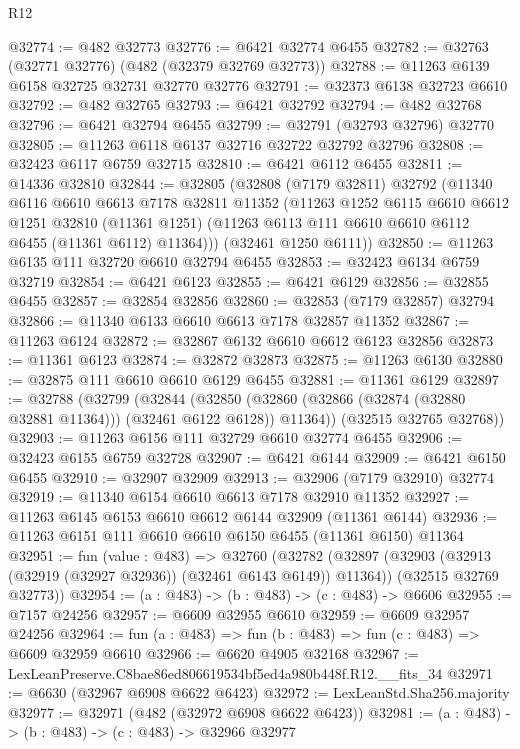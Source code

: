 \begin{lexlean}{R12}
\begin{coremodule}
@32774 := @482 @32773
@32776 := @6421 @32774 @6455
@32782 := @32763 (@32771 @32776) (@482 (@32379 @32769 @32773))
@32788 := @11263 @6139 @6158 @32725 @32731 @32770 @32776
@32791 := @32373 @6138 @32723 @6610
@32792 := @482 @32765
@32793 := @6421 @32792
@32794 := @482 @32768
@32796 := @6421 @32794 @6455
@32799 := @32791 (@32793 @32796) @32770
@32805 := @11263 @6118 @6137 @32716 @32722 @32792 @32796
@32808 := @32423 @6117 @6759 @32715
@32810 := @6421 @6112 @6455
@32811 := @14336 @32810
@32844 := @32805
    (@32808
      (@7179 @32811)
      @32792
      (@11340
        @6116
        @6610
        @6613
        @7178
        @32811
        @11352
        (@11263
          @1252
          @6115
          @6610
          @6612
          @1251
          @32810
          (@11361 @1251)
          (@11263 @6113 @111 @6610 @6610 @6112 @6455 (@11361 @6112) @11364)))
      (@32461 @1250 @6111))
@32850 := @11263 @6135 @111 @32720 @6610 @32794 @6455
@32853 := @32423 @6134 @6759 @32719
@32854 := @6421 @6123
@32855 := @6421 @6129
@32856 := @32855 @6455
@32857 := @32854 @32856
@32860 := @32853 (@7179 @32857) @32794
@32866 := @11340 @6133 @6610 @6613 @7178 @32857 @11352
@32867 := @11263 @6124
@32872 := @32867 @6132 @6610 @6612 @6123 @32856
@32873 := @11361 @6123
@32874 := @32872 @32873
@32875 := @11263 @6130
@32880 := @32875 @111 @6610 @6610 @6129 @6455
@32881 := @11361 @6129
@32897 := @32788
    (@32799
      (@32844
        (@32850 (@32860 (@32866 (@32874 (@32880 @32881 @11364))) (@32461 @6122 @6128)) @11364))
      (@32515 @32765 @32768))
@32903 := @11263 @6156 @111 @32729 @6610 @32774 @6455
@32906 := @32423 @6155 @6759 @32728
@32907 := @6421 @6144
@32909 := @6421 @6150 @6455
@32910 := @32907 @32909
@32913 := @32906 (@7179 @32910) @32774
@32919 := @11340 @6154 @6610 @6613 @7178 @32910 @11352
@32927 := @11263 @6145 @6153 @6610 @6612 @6144 @32909 (@11361 @6144)
@32936 := @11263 @6151 @111 @6610 @6610 @6150 @6455 (@11361 @6150) @11364
@32951 := fun (value : @483) =>
  @32760
    (@32782
      (@32897 (@32903 (@32913 (@32919 (@32927 @32936)) (@32461 @6143 @6149)) @11364))
      (@32515 @32769 @32773))
@32954 := (a : @483) -> (b : @483) -> (c : @483) -> @6606
@32955 := @7157 @24256
@32957 := @6609 @32955 @6610
@32959 := @6609 @32957 @24256
@32964 := fun (a : @483) => fun (b : @483) => fun (c : @483) => @6609 @32959 @6610
@32966 := @6620 @4905 @32168
@32967 := LexLeanPreserve.C8bae86ed806619534bf5ed4a980b448f.R12.__fits_34
@32971 := @6630 (@32967 @6908 @6622 @6423)
@32972 := LexLeanStd.Sha256.majority
@32977 := @32971 (@482 (@32972 @6908 @6622 @6423))
@32981 := (a : @483) -> (b : @483) -> (c : @483) -> @32966 @32977

\end{coremodule}
\end{lexlean}
